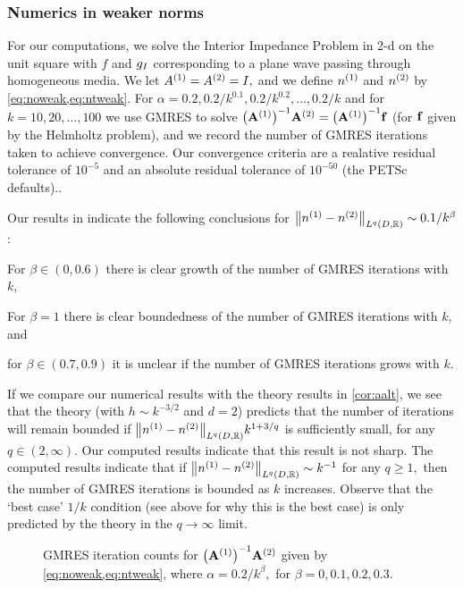 \subsubsection{Numerics in weaker norms}\label{sec:weakernumerics}
For our computations, we solve the Interior Impedance Problem in 2-d on the unit square with $f$ and $g_{I}$ corresponding to a plane wave passing through homogeneous media. We let ${A}^{(1)}={A}^{(2)}=I,$ and we define ${n}^{(1)}$ and ${n}^{(2)}$ by \cref{eq:noweak,eq:ntweak}. For $\alpha = 0.2,0.2/k^{0.1},0.2/k^{0.2},\ldots,0.2/k$ and for $k=10,20,\ldots,100$ we use GMRES to solve $\AmatoI\Amatt = \AmatoI \bff$ (for $\mathbf{f}$ given by the Helmholtz problem), and we record the number of GMRES iterations taken to achieve convergence. Our convergence criteria are a realative residual tolerance of $10^{-5}$ and an absolute residual tolerance of $10^{-50}$ (the PETSc defaults)..

Our results in indicate the following conclusions for $\NLqDRR{\nso-\nst} \sim 0.1/k^{\beta}$ :
\bit
\item For $\beta \in (0,0.6)$ there is clear growth of the number of GMRES iterations with $k$,
\item For $\beta = 1$ there is clear boundedness of the number of GMRES iterations with $k$, and
  \item for $\beta \in (0.7,0.9)$ it is unclear if the number of GMRES iterations grows with $k.$
\eit

If we compare our numerical results with the theory results in \cref{cor:aalt}, we see that the theory (with $h \sim k^{-3/2}$ and $d=2$) predicts that the number of iterations will remain bounded if $\NLqDRR{\nso-\nst} k^{1+3/q}$ is sufficiently small, for any $q \in (2,\infty).$ Our computed results indicate that this result is not sharp. The computed results indicate that if $\NLqDRR{\nso-\nst} \sim k^{-1}$ for any $q \geq 1,$ then the number of GMRES iterations is bounded as $k$ increases. Observe that the `best case' $1/k$ condition (see  above for why this is the best case) is only predicted by the theory in the $q\rightarrow \infty$ limit.


\begin{figure}

  \caption{GMRES iteration counts for $\AmatoI\Amatt$ given by \cref{eq:noweak,eq:ntweak}, where $\alpha = 0.2/k^\beta,$ for $\beta = 0,0.1,0.2,0.3.$}\label{fig:l1low}
\end{figure}

